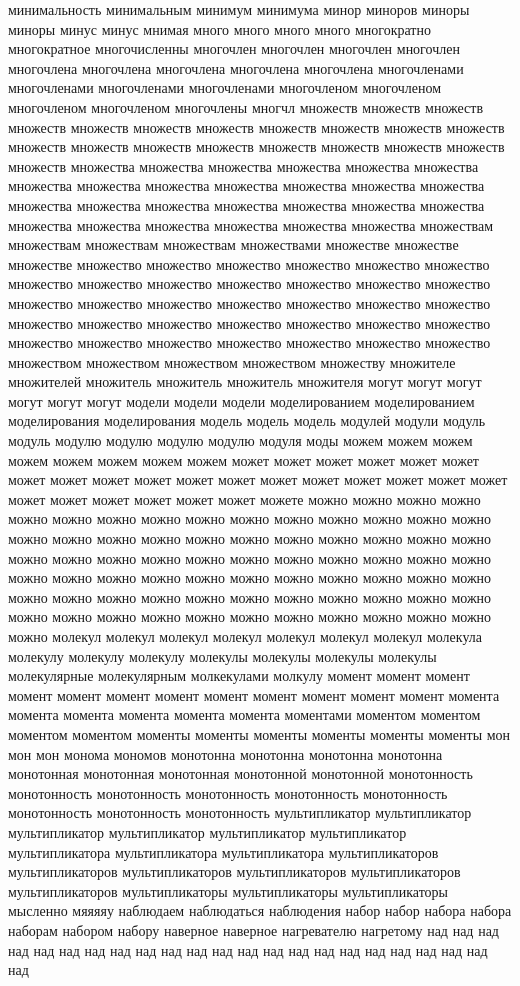 минимальность минимальным минимум минимума минор миноров миноры миноры минус минус мнимая много много много много многократно многократное многочисленны многочлен многочлен многочлен многочлен многочлена многочлена многочлена многочлена многочлена многочленами многочленами многочленами многочленами многочленом многочленом многочленом многочленом многочлены многчл множеств множеств множеств множеств множеств множеств множеств множеств множеств множеств множеств множеств множеств множеств множеств множеств множеств множеств множеств множеств множества множества множества множества множества множества множества множества множества множества множества множества множества множества множества множества множества множества множества множества множества множества множества множества множества множества множествам множествам множествам множествам множествами множестве множестве множестве множество множество множество множество множество множество множество множество множество множество множество множество множество множество множество множество множество множество множество множество множество множество множество множество множество множество множество множество множество множество множество множество множество множество множеством множеством множеством множеством множеству множителе множителей множитель множитель множитель множителя могут могут могут могут могут могут модели модели модели моделированием моделированием моделирования моделирования модель модель модель модулей модули модуль модуль модулю модулю модулю модулю модуля моды можем можем можем можем можем можем можем можем может может может может может может может может может может может может может может может может может может может может может может может может можете можно можно можно можно можно можно можно можно можно можно можно можно можно можно можно можно можно можно можно можно можно можно можно можно можно можно можно можно можно можно можно можно можно можно можно можно можно можно можно можно можно можно можно можно можно можно можно можно можно можно можно можно можно можно можно можно можно можно можно можно можно можно можно можно можно можно можно можно можно можно можно молекул молекул молекул молекул молекул молекул молекул молекула молекулу молекулу молекулу молекулы молекулы молекулы молекулы молекулярные молекулярным молкекулами молкулу момент момент момент момент момент момент момент момент момент момент момент момент момента момента момента момента момента момента моментами моментом моментом моментом моментом моменты моменты моменты моменты моменты моменты мон мон мон монома мономов монотонна монотонна монотонна монотонна монотонная монотонная монотонная монотонной монотонной монотонность монотонность монотонность монотонность монотонность монотонность монотонность монотонность монотонность мультипликатор мультипликатор мультипликатор мультипликатор мультипликатор мультипликатор мультипликатора мультипликатора мультипликатора мультипликаторов мультипликаторов мультипликаторов мультипликаторов мультипликаторов мультипликаторов мультипликаторы мультипликаторы мультипликаторы мысленно мяяяяу наблюдаем наблюдаться наблюдения набор набор набора набора наборам набором набору наверное наверное нагревателю нагретому над над над над над над над над над над над над над над над над над над над над над над над 